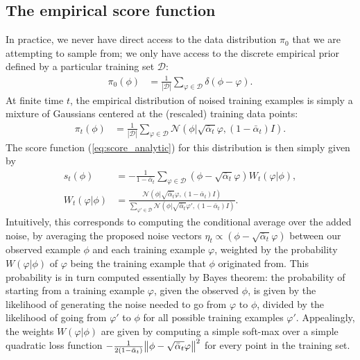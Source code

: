 \documentclass{article}
\theoremstyle{plain}
\theoremstyle{definition}
\theoremstyle{remark}
\begin{document}
\subsection{The empirical score function}
In practice, we never have direct access to the data distribution $\pi_0$ that we are attempting to sample from; we only have access to the  discrete empirical prior defined by a particular training set $\mathcal{D}$:
\begin{align}\label{eq:empirical_prior}
    \pi_0(\phi) &= \frac{1}{|\mathcal{D}|} \sum_{\varphi \in \mathcal{D}} \delta(\phi - \varphi).
\end{align}
At finite time $t$, the empirical distribution of noised training examples is simply a mixture of Gaussians centered at the (rescaled) training data points:
\begin{align}
    \pi_t(\phi) &= \frac{1}{|\mathcal{D}|} \sum_{\varphi \in \mathcal{D}} \mathcal{N}(\phi|\sqrt{\bar{\alpha}_t} \varphi, (1 - \bar{\alpha}_t)I).
\end{align}
The score function (\ref{eq:score_analytic}) for this distribution is then simply given by
\begin{align}\label{eq:optimal_discrete_score2}
    s_t(\phi) &= -\frac{1}{1 - \bar{\alpha}_t}\sum_{\varphi \in \mathcal{D}} (\phi - \sqrt{\bar{\alpha}_t} \varphi) W_t(\varphi|\phi), \\
    W_t(\varphi|\phi) &= \frac{\mathcal{N}(\phi| \sqrt{\bar{\alpha}_t} \varphi, (1 - \bar{\alpha}_t ) I)}{\sum_{\varphi' \in \mathcal{D}} \mathcal{N}(\phi| \sqrt{\bar{\alpha}_t} \varphi', (1 - \bar{\alpha}_t ) I)}.
\end{align}
Intuitively, this corresponds to computing the conditional average over the added noise, by averaging the proposed noise vectors $\eta_t \propto (\phi - \sqrt{\bar{\alpha}_t}\varphi)$ between our observed example $\phi$ and each training example $\varphi$, weighted by the probability $W(\varphi|\phi)$ of $\varphi$ being the training example that $\phi$ originated from. This probability is in turn computed essentially by Bayes theorem: the probability of starting from a training example $\varphi$, given the observed $\phi$, is given by the likelihood of generating the noise needed to go from $\varphi$ to $\phi$, divided by the likelihood of going from $\varphi'$ to $\phi$ for all possible training examples $\varphi'$. Appealingly, the weights $W(\varphi|\phi)$ are given by computing a simple soft-max over a simple quadratic loss function $-\frac{1}{2(1 - \bar{\alpha}_t)}\norm{\phi - \sqrt{\bar{\alpha}_t} \varphi}^2$ for every point in the training set.
\end{document}
